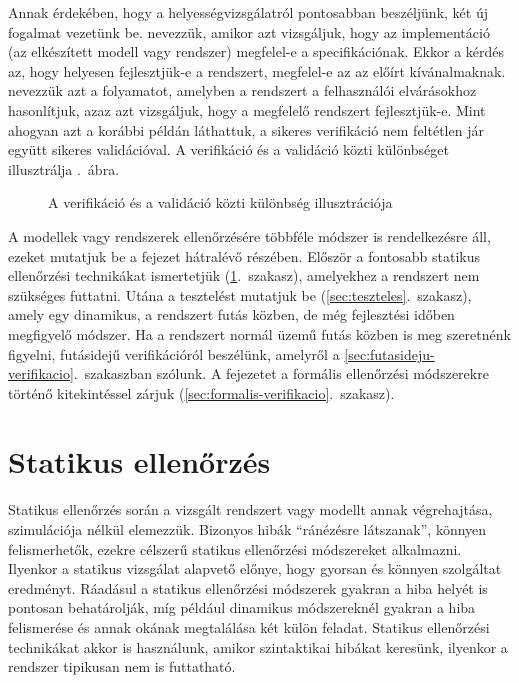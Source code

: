 Annak érdekében, hogy a helyességvizsgálatról pontosabban beszéljünk, két új fogalmat vezetünk be.  nevezzük, amikor azt vizsgáljuk, hogy az implementáció (az elkészített modell vagy rendszer) megfelel-e a specifikációnak. Ekkor a kérdés az, hogy helyesen fejlesztjük-e a rendszert, megfelel-e az az előírt kívánalmaknak.  nevezzük azt a folyamatot, amelyben a rendszert a felhasználói elvárásokhoz hasonlítjuk, azaz azt vizsgáljuk, hogy a megfelelő rendszert fejlesztjük-e. Mint ahogyan azt a korábbi példán láthattuk, a sikeres verifikáció nem feltétlen jár együtt sikeres validációval. A verifikáció és a validáció közti különbséget illusztrálja .~ábra.

\begin{figure}[h]
	\centering
	
	
	\caption{A verifikáció és a validáció közti különbség illusztrációja}
	\label{fig:verifikacio_vs_validacio}
\end{figure}

A modellek vagy rendszerek ellenőrzésére többféle módszer is rendelkezésre áll, ezeket mutatjuk be a fejezet hátralévő részében. Először a fontosabb statikus ellenőrzési technikákat ismertetjük (\ref{sec:statikus-ellenorzes}.~szakasz), amelyekhez a rendszert nem szükséges futtatni. Utána a tesztelést mutatjuk be (\ref{sec:teszteles}.~szakasz), amely egy dinamikus, a rendszert futás közben, de még fejlesztési időben megfigyelő módszer. Ha a rendszert normál üzemű futás közben is meg szeretnénk figyelni, futásidejű verifikációról beszélünk, amelyről a \ref{sec:futasideju-verifikacio}.~szakaszban szólunk. A fejezetet a formális ellenőrzési módszerekre történő kitekintéssel zárjuk (\ref{sec:formalis-verifikacio}.~szakasz).



\section{Statikus ellenőrzés}\label{sec:statikus-ellenorzes}
Statikus ellenőrzés során a vizsgált rendszert vagy modellt annak végrehajtása, szimulációja nélkül elemezzük. Bizonyos hibák ``ránézésre látszanak'', könnyen felismerhetők, ezekre célszerű statikus ellenőrzési módszereket alkalmazni. Ilyenkor a statikus vizsgálat alapvető előnye, hogy gyorsan és könnyen szolgáltat eredményt. Ráadásul a statikus ellenőrzési módszerek gyakran a hiba helyét is pontosan behatárolják, míg például dinamikus módszereknél gyakran a hiba felismerése és annak okának megtalálása két külön feladat. Statikus ellenőrzési technikákat akkor is használunk, amikor szintaktikai hibákat keresünk, ilyenkor a rendszer tipikusan nem is futtatható.

